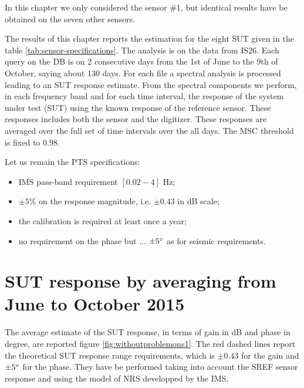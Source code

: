 
In this chapter we only considered the sensor \#1, but identical results have be obtained on the seven other sensors.

The results of this chapter reports the estimation for the eight SUT given in the table \ref{tab:sensor-specifications}.
The analysis is on the data from IS26. Each query on the DB is on 2 consecutive days from the 1st of June to the 9th of October, saying about 130 days. For each file a spectral analysis is processed leading to an SUT response estimate. From the spectral components we perform, in each frequency band and for each time interval, the response of the system under test (SUT) using the known response of the reference sensor. These responses includes both the sensor and the digitizer. These responses are averaged over the full set of time intervals over the all days. The  MSC threshold is fixed to $0.98$. 

Let us remain the PTS specifications:
\begin{itemize}
\item
IMS pass-band requirement $[0.02 - 4]$ Hz;
 \item
$\pm 5\%$ on the response magnitude, i.e. $\pm 0.43$ in dB scale;
\item
the calibration is required at least once a year;
 \item
no requirement  on the phase but $\ldots$ $\pm 5^{\circ}$ as for seismic requirements.
\end{itemize}


\section{SUT response by averaging from June to October 2015}
The average estimate of the SUT response, in terms of gain in dB and phase in degree, are reported figure \ref{fig:withoutproblemons1}. The red dashed lines report the theoretical SUT response range requirements, which is $\pm 0.43$ for the gain and $\pm 5^{\circ}$ for the phase. They have be performed taking into account the SREF sensor response and using the model of NRS developped by the IMS.

